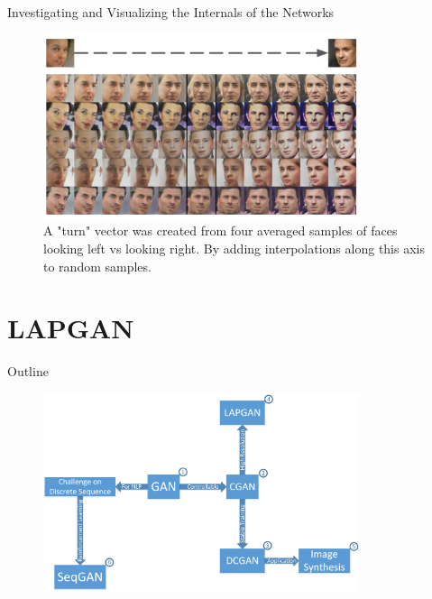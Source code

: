 \documentclass[10pt]{beamer}
\newcommand{\subtitlepage}[3]{\title{#1}\subtitle{#2}\author{#3}\date{}\begin{frame}[plain]\titlepage\end{frame}}
\begin{document}
	\begin{frame}{Investigating and Visualizing the Internals of the Networks}
		\begin{figure}
			\includegraphics[width=25em]{figures/DCGAN-visualizing-internals-vector-4.PNG}
			\caption{A "turn" vector was created from four averaged samples of faces looking left vs looking right. By adding interpolations along this axis to random samples.}
		\end{figure}
	\end{frame}

	
	\part{LAPGAN}
	\begin{frame}{Outline}
		\begin{figure}
			\includegraphics[width=25em]{figures/outline.png}
		\end{figure}
	\end{frame}
	\subtitlepage{}{Deep Generative Image Models using a Laplacian Pyramid of Adversarial Networks}{Emily Denton, Soumith Chintala, Arthur Szlam, Rob Fergus\\NIPS 2015\\arXiv: 1506.05751}
	
\end{document}

